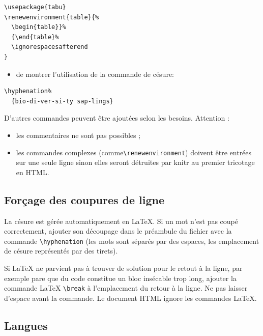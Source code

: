 \documentclass[fleqn,10pt]{ArtEcoFoG} %
\providecommand{\tightlist}{%
  \setlength{\itemsep}{0pt}\setlength{\parskip}{0pt}}
\begin{document}
\begin{verbatim}
\usepackage{tabu}
\renewenvironment{table}{%
  \begin{table}}%
  {\end{table}%
  \ignorespacesafterend
}
\end{verbatim}

\begin{itemize}
\tightlist
\item
  de montrer l'utilisation de la commande de césure:
\end{itemize}

\begin{verbatim}
\hyphenation%
  {bio-di-ver-si-ty sap-lings}
\end{verbatim}

D'autres commandes peuvent être ajoutées selon les besoins.
Attention :

\begin{itemize}
\tightlist
\item
  les commentaires ne sont pas possibles ;
\item
  les commandes complexes (comme\break \texttt{\textbackslash{}renewenvironment}) doivent être entrées sur une seule ligne sinon elles seront détruites par knitr au premier tricotage en HTML.
\end{itemize}

\hypertarget{foruxe7age-des-coupures-de-ligne}{%
\subsection{Forçage des coupures de ligne}\label{foruxe7age-des-coupures-de-ligne}}

La césure est gérée automatiquement en LaTeX.
Si un mot n'est pas coupé correctement, ajouter son découpage dans le préambule du fichier avec la commande \texttt{\textbackslash{}hyphenation} (les mots sont séparés par des espaces, les emplacement de césure représentés par des tirets).

Si LaTeX ne parvient pas à trouver de solution pour le retout à la ligne, par exemple pare que du code constitue un bloc insécable trop long, ajouter la commande LaTeX \texttt{\textbackslash{}break} à l'emplacement du retour à la ligne.
Ne pas laisser d'espace avant la commande.
Le document HTML ignore les commandes LaTeX.

\hypertarget{langues}{%
\subsection{Langues}\label{langues}}
\end{document}
